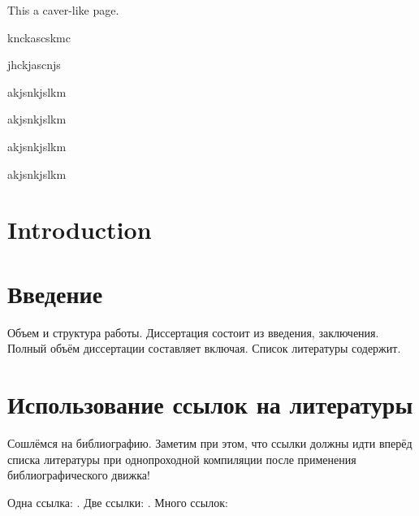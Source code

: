 \documentclass[a4paper, 12pt, oneside, openany]{article}
\begin{document}
    This a caver-like page.
    \lipsum[1-7]

    knckascskmc \par
    jhckjascnjs \par
    akjsnkjslkm \par
    akjsnkjslkm \par
    akjsnkjslkm \par
    akjsnkjslkm \par

    \section{Introduction}
    \lipsum

    \lipsum \lipsum
    \lipsum \lipsum

    \section{Введение}
    Объем и структура работы. Диссертация состоит из введения,
    заключения. Полный объём диссертации составляет включая. 
    Список литературы содержит.
    

    
    
    \pagebreak
    \section{Использование ссылок на литературы}
    Сошлёмся на библиографию. Заметим при этом, что ссылки должны идти вперёд списка литературы 
    при однопроходной компиляции после применения библиографического движка!
    

    Одна ссылка:    \cite[с.~54]{Sokolov} \cite[с.~36]{Gaidaenko}.
    Две ссылки:     \cite{Sokolov, Gaidaenko}.
    Много ссылок:   \cite{Lermontov, Management, Borozda, Marketing, Constitution, FamilyCode,
    Gost.7.0.53, Razumovski, Lagkueva, Pokrovski, Methodology, Berestova, Kriger}
    
    \insertBiblio
\end{document}
